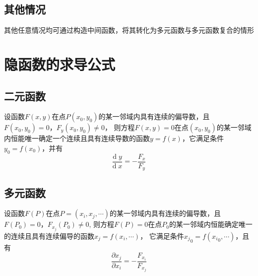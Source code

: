 \documentclass[UTF8]{ctexart}
\newcommand{\dif}[1]{{\text{d}\;\!#1}}
\begin{document}
\subsection*{其他情况}
其他任意情况均可通过构造中间函数，将其转化为多元函数与多元函数复合的情形
\bigskip
\bigskip

\section*{隐函数的求导公式}

\bigskip
\subsection*{二元函数}
设函数$F(x,y)$在点$P(x_0,y_0)$的某一邻域内具有连续的偏导数，且$F(x_0,y_0)=0$，$F_y(x_0,y_0)\ne0$，
则方程$F(x,y)=0$在点$(x_0,y_0)$的某一邻域内恒能唯一确定一个连续且具有连续导数的函数$y=f(x)$，它满足条件$y_0=f(x_0)$，并有
\[ \frac{\dif{y}}{\dif{x}}=-\frac{F_x}{F_y} \]

\subsection*{多元函数}
设函数$F(P)$在点$P = (x_i,x_j,\cdots)$的某一邻域内具有连续的偏导数，且$F(P_0)=0$，$F_{x_j}(P_0)\ne0$,
则方程$F(P)=0$在点$P_0$的某一邻域内恒能确定唯一的连续且具有连续偏导的函数$x_j=f(x_i,\cdots)$，
它满足条件${x_j}_0=f({x_i}_0,\cdots)$，且有
\[\frac{\partial x_j}{\partial x_i} = -\frac{F_{x_i}}{F_{x_j}}\]
\end{document}
